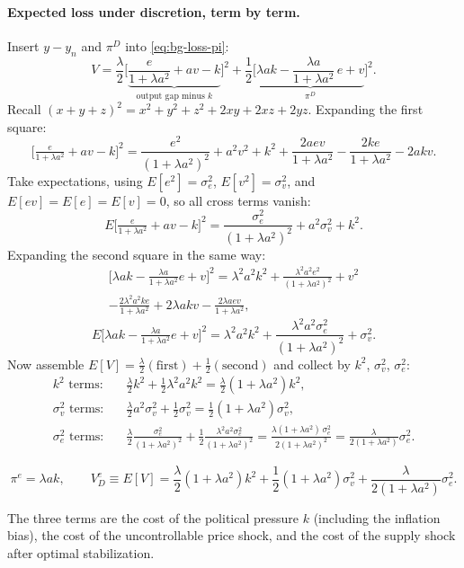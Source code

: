\paragraph{Expected loss under discretion, term by term.} Insert $y-y_n$ and $\pi^D$ into \eqref{eq:bg-loss-pi}:
\[
V=\frac{\lambda}{2}\Big[\underbrace{\frac{e}{1+\lambda a^2}+av-k}_{\text{output gap minus }k}\Big]^2
+\frac12\Big[\underbrace{\lambda ak-\frac{\lambda a}{1+\lambda a^2}\,e+v}_{\pi^D}\Big]^2 .
\]
Recall $(x+y+z)^2=x^2+y^2+z^2+2xy+2xz+2yz$. Expanding the first square:
\[
\Big[\tfrac{e}{1+\lambda a^2}+av-k\Big]^2=\frac{e^2}{(1+\lambda a^2)^2}+a^2v^2+k^2+\frac{2aev}{1+\lambda a^2}-\frac{2ke}{1+\lambda a^2}-2akv .
\]
Take expectations, using $E[e^2]=\sigma_e^2$, $E[v^2]=\sigma_v^2$, and $E[ev]=E[e]=E[v]=0$, so all cross terms vanish:
\[
E\Big[\tfrac{e}{1+\lambda a^2}+av-k\Big]^2=\frac{\sigma_e^2}{(1+\lambda a^2)^2}+a^2\sigma_v^2+k^2 .
\]
Expanding the second square in the same way:
\begin{multline*}
\Big[\lambda ak-\tfrac{\lambda a}{1+\lambda a^2}e+v\Big]^2=\lambda^2a^2k^2+\frac{\lambda^2a^2e^2}{(1+\lambda a^2)^2}+v^2\\
-\frac{2\lambda^2a^2ke}{1+\lambda a^2}+2\lambda akv-\frac{2\lambda aev}{1+\lambda a^2},
\end{multline*}
\[
E\Big[\lambda ak-\tfrac{\lambda a}{1+\lambda a^2}e+v\Big]^2=\lambda^2a^2k^2+\frac{\lambda^2a^2\sigma_e^2}{(1+\lambda a^2)^2}+\sigma_v^2 .
\]
Now assemble $E[V]=\frac{\lambda}{2}(\text{first})+\frac12(\text{second})$ and collect by $k^2$, $\sigma_v^2$, $\sigma_e^2$:
\begin{align*}
k^2\text{ terms:}\quad&\frac{\lambda}{2}k^2+\frac12\lambda^2a^2k^2=\frac{\lambda}{2}(1+\lambda a^2)k^2,\\
\sigma_v^2\text{ terms:}\quad&\frac{\lambda}{2}a^2\sigma_v^2+\frac12\sigma_v^2=\frac12(1+\lambda a^2)\sigma_v^2,\\
\sigma_e^2\text{ terms:}\quad&\frac{\lambda}{2}\frac{\sigma_e^2}{(1+\lambda a^2)^2}+\frac12\frac{\lambda^2a^2\sigma_e^2}{(1+\lambda a^2)^2}
=\frac{\lambda(1+\lambda a^2)\,\sigma_e^2}{2(1+\lambda a^2)^2}=\frac{\lambda}{2(1+\lambda a^2)}\sigma_e^2 .
\end{align*}
\begin{keybox}[title=Equilibrium under discretion]
\begin{equation}
\pi^e=\lambda ak,\qquad
V_D^e\equiv E[V]=\frac{\lambda}{2}(1+\lambda a^2)k^2+\frac12(1+\lambda a^2)\sigma_v^2+\frac{\lambda}{2(1+\lambda a^2)}\sigma_e^2 .\label{eq:bg-VD}
\end{equation}
\end{keybox}
The three terms are the cost of the political pressure $k$ (including the inflation bias), the cost of the uncontrollable price shock, and the cost of the supply shock after optimal stabilization.

